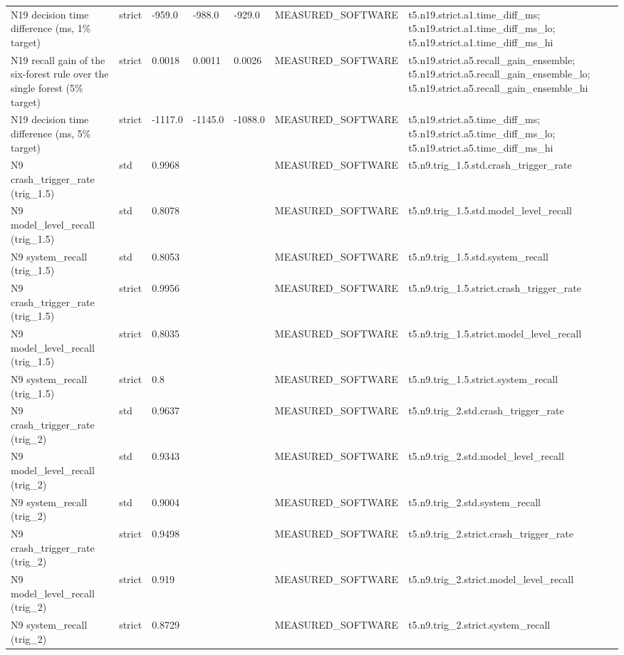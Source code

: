 \begin{table}[t]
\begin{tabular}{lllllll}
N19 decision time difference (ms, 1\% target) & strict & -959.0 & -988.0 & -929.0 & MEASURED\_SOFTWARE & t5.n19.strict.a1.time\_diff\_ms; t5.n19.strict.a1.time\_diff\_ms\_lo; t5.n19.strict.a1.time\_diff\_ms\_hi \\
N19 recall gain of the six-forest rule over the single forest (5\% target) & strict & 0.0018 & 0.0011 & 0.0026 & MEASURED\_SOFTWARE & t5.n19.strict.a5.recall\_gain\_ensemble; t5.n19.strict.a5.recall\_gain\_ensemble\_lo; t5.n19.strict.a5.recall\_gain\_ensemble\_hi \\
N19 decision time difference (ms, 5\% target) & strict & -1117.0 & -1145.0 & -1088.0 & MEASURED\_SOFTWARE & t5.n19.strict.a5.time\_diff\_ms; t5.n19.strict.a5.time\_diff\_ms\_lo; t5.n19.strict.a5.time\_diff\_ms\_hi \\
N9 crash\_trigger\_rate (trig\_1.5) & std & 0.9968 &  &  & MEASURED\_SOFTWARE & t5.n9.trig\_1.5.std.crash\_trigger\_rate \\
N9 model\_level\_recall (trig\_1.5) & std & 0.8078 &  &  & MEASURED\_SOFTWARE & t5.n9.trig\_1.5.std.model\_level\_recall \\
N9 system\_recall (trig\_1.5) & std & 0.8053 &  &  & MEASURED\_SOFTWARE & t5.n9.trig\_1.5.std.system\_recall \\
N9 crash\_trigger\_rate (trig\_1.5) & strict & 0.9956 &  &  & MEASURED\_SOFTWARE & t5.n9.trig\_1.5.strict.crash\_trigger\_rate \\
N9 model\_level\_recall (trig\_1.5) & strict & 0.8035 &  &  & MEASURED\_SOFTWARE & t5.n9.trig\_1.5.strict.model\_level\_recall \\
N9 system\_recall (trig\_1.5) & strict & 0.8 &  &  & MEASURED\_SOFTWARE & t5.n9.trig\_1.5.strict.system\_recall \\
N9 crash\_trigger\_rate (trig\_2) & std & 0.9637 &  &  & MEASURED\_SOFTWARE & t5.n9.trig\_2.std.crash\_trigger\_rate \\
N9 model\_level\_recall (trig\_2) & std & 0.9343 &  &  & MEASURED\_SOFTWARE & t5.n9.trig\_2.std.model\_level\_recall \\
N9 system\_recall (trig\_2) & std & 0.9004 &  &  & MEASURED\_SOFTWARE & t5.n9.trig\_2.std.system\_recall \\
N9 crash\_trigger\_rate (trig\_2) & strict & 0.9498 &  &  & MEASURED\_SOFTWARE & t5.n9.trig\_2.strict.crash\_trigger\_rate \\
N9 model\_level\_recall (trig\_2) & strict & 0.919 &  &  & MEASURED\_SOFTWARE & t5.n9.trig\_2.strict.model\_level\_recall \\
N9 system\_recall (trig\_2) & strict & 0.8729 &  &  & MEASURED\_SOFTWARE & t5.n9.trig\_2.strict.system\_recall \\

\end{tabular}
\end{table}
